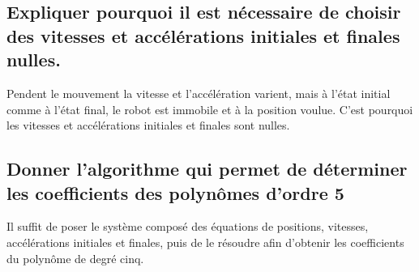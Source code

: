 \documentclass[]{article}
\begin{document}
\subsection{Expliquer pourquoi il est nécessaire de choisir des vitesses
et accélérations initiales et finales nulles.}

Pendent le mouvement la vitesse et l’accélération varient, mais à l'état initial comme à l'état final, le robot est immobile et à la position voulue. C'est pourquoi les vitesses et accélérations initiales et finales sont nulles.

\subsection{Donner l'algorithme qui permet de déterminer les
coefficients des polynômes d'ordre 5}

Il suffit de poser le système composé des équations de positions, vitesses, accélérations initiales et finales, puis de le résoudre afin d'obtenir les coefficients du polynôme de degré cinq.
\end{document}
